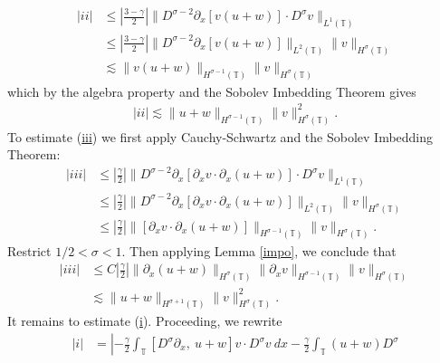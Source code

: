 \documentclass[12pt,reqno]{amsart}
\newcommand{\p}{\partial}
\newcommand{\ci}{\mathbb{T}}
\theoremstyle{plain}  %
\theoremstyle{definition}
\begin{document}
\begin{appendices}
\begin{equation*}
\begin{split}
			|ii|
			& \le \left | \frac{3-\gamma}{2} \right | \|D^{\sigma -2}
			\p_x [v(u+w)] \cdot D^\sigma
			v  \|_{L^1(\ci)}
			\\
			 & \le  \left | \frac{3-\gamma}{2} \right | \|D^{\sigma -2} \p_x [v(u+w)]
			\|_{L^2(\ci)} \|v\|_{H^\sigma(\ci)}
			\\
			& \lesssim \|v(u+w)\|_{H^{\sigma -1}(\ci)} \|v\|_{H^\sigma(\ci)}
		\end{split}
	\end{equation*}
	which by the algebra property and the Sobolev
	Imbedding Theorem gives
\begin{equation}
		\begin{split}
		|ii| \lesssim \|u+w\|_{H^{\sigma -1}(\ci)} \|v\|_{H^\sigma(\ci)}^2.
			\label{3v}
		\end{split}
	\end{equation}
	To estimate (\hyperref[2v]{iii}) we first apply
	Cauchy-Schwartz and the Sobolev Imbedding Theorem:
	\begin{equation*}
		\begin{split}
		|iii| & \le	\left | \frac{\gamma}{2} \right | \|D^{\sigma -2} \p_x
			[\p_x v \cdot \p_x (u+w)] \cdot D^\sigma v  \|_{L^1(\ci)} 
			\\
			& \le  \left | \frac{\gamma}{2} \right | \|D^{\sigma -2} \p_x
			[\p_x v \cdot \p_x (u+w)] \|_{L^2(\ci)}
			\|v\|_{H^\sigma(\ci)}
			\\
			& \le \left |\frac{\gamma}{2} \right|
			\|[\p_x v \cdot \p_x (u+w)] \|_{H^{\sigma -1}(\ci)}
			\|v\|_{H^\sigma(\ci)}.
		\end{split}
	\end{equation*}
	Restrict $1/2 < \sigma < 1$. Then applying Lemma \ref{impo}, we conclude
	that
	\begin{equation}
		\begin{split}
			|iii|
			& \le C \left | \frac{\gamma}{2} \right |
			\|\p_x(u+w) \|_{H^{\sigma}(\ci)}
			\|\p_x v\|_{H^{\sigma -1}(\ci)} \|v\|_{H^\sigma(\ci)}
			\\
			& \lesssim \|u+w \|_{H^{\sigma + 1}(\ci)}
			\|v\|_{H^\sigma(\ci)}^2.
			\label{3'v}
		\end{split}
	\end{equation}
	It remains to estimate (\hyperref[2v]{i}).
	Proceeding, we rewrite
	\begin{equation}
		\begin{split}
			|i| & =
			\left |
			-\frac{\gamma}{2} \int_{\ci} \left[ D^\sigma \p_x, \ u+w \right]v \cdot
			D^\sigma v \ dx - \frac{\gamma}{2} \int_{\ci} (u+w) D^\sigma

\end{split}
\end{equation}
\end{appendices}
\end{document}
